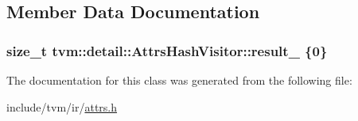 \subsection{Member Data Documentation}
\subsubsection[{\texorpdfstring{result\+\_\+}{result_}}]{\setlength{\rightskip}{0pt plus 5cm}size\+\_\+t tvm\+::detail\+::\+Attrs\+Hash\+Visitor\+::result\+\_\+ \{0\}}\hypertarget{classtvm_1_1detail_1_1AttrsHashVisitor_ae9491954f6d62082106ec1a89297a344}{}\label{classtvm_1_1detail_1_1AttrsHashVisitor_ae9491954f6d62082106ec1a89297a344}


The documentation for this class was generated from the following file\+:\begin{DoxyCompactItemize}
\item 
include/tvm/ir/\hyperlink{ir_2attrs_8h}{attrs.\+h}\end{DoxyCompactItemize}
